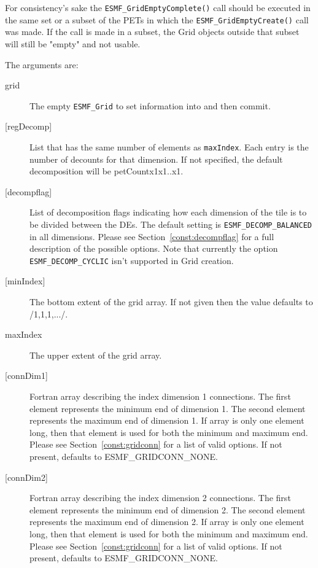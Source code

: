    For consistency's sake the {\tt ESMF\_GridEmptyComplete()} call
   should be executed in the same set or a subset of the PETs in which the
   {\tt ESMF\_GridEmptyCreate()} call was made. If the call
   is made in a subset, the Grid objects outside that subset will
   still be "empty" and not usable.
  
   The arguments are:
   \begin{description}
   \item[grid]
       The empty {\tt ESMF\_Grid} to set information into and then commit.
   \item[{[regDecomp]}]
        List that has the same number of elements as {\tt maxIndex}.
        Each entry is the number of decounts for that dimension.
        If not specified, the default decomposition will be petCountx1x1..x1.
   \item[{[decompflag]}]
        List of decomposition flags indicating how each dimension of the
        tile is to be divided between the DEs. The default setting
        is {\tt ESMF\_DECOMP\_BALANCED} in all dimensions. Please see
        Section~\ref{const:decompflag} for a full description of the
        possible options. Note that currently the option
        {\tt ESMF\_DECOMP\_CYCLIC} isn't supported in Grid creation.
   \item[{[minIndex]}]
        The bottom extent of the grid array. If not given then the value defaults
        to /1,1,1,.../.
   \item[maxIndex]
        The upper extent of the grid array.
   \item[{[connDim1]}]
        Fortran array describing the index dimension 1 connections.
        The first element represents the minimum end of dimension 1.
        The second element represents the maximum end of dimension 1.
        If array is only one element long, then that element is used
        for both the minimum and maximum end.
        Please see Section~\ref{const:gridconn} for a list of valid
        options. If not present, defaults to ESMF\_GRIDCONN\_NONE.
   \item[{[connDim2]}]
        Fortran array describing the index dimension 2 connections.
        The first element represents the minimum end of dimension 2.
        The second element represents the maximum end of dimension 2.
        If array is only one element long, then that element is used
        for both the minimum and maximum end.
        Please see Section~\ref{const:gridconn} for a list of valid
        options. If not present, defaults to ESMF\_GRIDCONN\_NONE.

\end{description}
